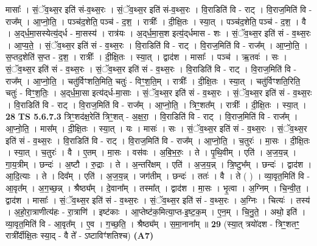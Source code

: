 \documentclass[17pt]{extarticle}
\begin{document}
                  मासाः᳚ । सं॒ॅव॒थ्स॒र इति॑ सं-व॒थ्स॒रः । सं॒ॅव॒थ्स॒र इति॑ सं-व॒थ्स॒रः । वि॒राडिति॑ वि -   राट् । वि॒राज॒मिति॑ वि - राज᳚म् । आ॒प्नो॒ति॒ । पञ्च॑द॒शेति॒ पञ्च॑ - द॒श॒ । रात्रीः᳚ । दी॒क्षि॒तः । स्या॒त् । पञ्च॑द॒शेति॒ पञ्च॑ - द॒श॒ । वै । अ॒द्‌र्ध॒मा॒सस्येत्य॒॑द्‌र्ध - मा॒सस्य॑ ।   रात्र॑यः । अ॒द्‌र्ध॒मा॒स॒श इत्य॒॑द्‌र्धमास -   शः । सं॒ॅव॒थ्स॒र इति॑ सं - व॒थ्स॒रः । आ॒प्य॒ते॒ । सं॒ॅव॒थ्स॒र इति॑ सं - व॒थ्स॒रः । वि॒राडिति॑ वि - राट् । वि॒राज॒मिति॑ वि - राज᳚म् । आ॒प्नो॒ति॒ । स॒प्तद॒शेति॑ स॒प्त - द॒श॒ । रात्रीः᳚ । दी॒क्षि॒तः । स्या॒त् । द्वाद॑श । मासाः᳚ । पञ्च॑ । ऋ॒तवः॑ । सः । सं॒ॅव॒थ्स॒र इति॑ सं - व॒थ्स॒रः । सं॒ॅव॒थ्स॒र इति॑ सं - व॒थ्स॒रः । वि॒राडिति॑ वि - राट् । वि॒राज॒मिति॑ वि - राज᳚म् । आ॒प्नो॒ति॒ । चतु॑र्विꣳशति॒मिति॒ चतुः॑ - विꣳ॒॒श॒ति॒म् । रात्रीः᳚ । दी॒क्षि॒तः । स्या॒त् । चतु॑र्विꣳशति॒रिति॒ चतुः॑ - विꣳ॒॒श॒तिः॒ । अ॒द्‌र्ध॒मा॒सा इत्य॑द्‌र्ध-मा॒साः । सं॒ॅव॒थ्स॒र इति॑ सं - व॒थ्स॒रः । सं॒ॅव॒थ्स॒र इति॑ सं - व॒थ्स॒रः । वि॒राडिति॑ वि - राट् । वि॒राज॒मिति॑ वि - राज᳚म् । आ॒प्नो॒ति॒ । त्रिꣳ॒॒शत᳚म् । रात्रीः᳚ । दी॒क्षि॒तः । स्या॒त् । \textbf{  28} \newline
                  \newline
                                \textbf{ TS 5.6.7.3} \newline
                  त्रिꣳ॒॒शद॑क्ष॒रेति॑ त्रिꣳ॒॒शत् - अ॒क्ष॒रा॒ । वि॒राडिति॑ वि - राट् । वि॒राज॒मिति॑ वि - राज᳚म् । आ॒प्नो॒ति॒ । मास᳚म् । दी॒क्षि॒तः । स्या॒त् । यः । मासः॑ । सः । सं॒ॅव॒थ्स॒र इति॑ सं - व॒थ्स॒रः । सं॒ॅव॒थ्स॒र इति॑ सं - व॒थ्स॒रः । वि॒राडिति॑ वि - राट् । वि॒राज॒मिति॑ वि - राज᳚म् । आ॒प्नो॒ति॒ । च॒तुरः॑ । मा॒सः । दी॒क्षि॒तः । स्या॒त् । च॒तुरः॑ । वै । ए॒तम् । मा॒सः । वस॑वः । अ॒बि॒भ॒रुः॒ । ते । पृ॒थि॒वीम् । एति॑ । अ॒ज॒य॒न्न् । गा॒य॒त्रीम् । छन्दः॑ । अ॒ष्टौ । रु॒द्राः । ते । अ॒न्तरि॑क्षम् । एति॑ । अ॒ज॒य॒न्न् । त्रि॒ष्टुभ᳚म् । छन्दः॑ । द्वाद॑श । आ॒दि॒त्याः । ते । दिव᳚म् । एति॑ । अ॒ज॒य॒न्न् । जग॑तीम् । छन्दः॑ । ततः॑ । वै । ते ( ) । व्या॒वृत॒मिति॑ वि - आ॒वृत᳚म् । अ॒ग॒च्छ॒न्न् । श्रैष्ठ्य᳚म् । दे॒वाना᳚म् । तस्मा᳚त् । द्वाद॑श । मा॒सः । भृ॒त्वा । अ॒ग्निम् । चि॒न्वी॒त॒ । द्वाद॑श । मासाः᳚ । सं॒ॅव॒थ्स॒र इति॑ सं - व॒थ्स॒रः । सं॒ॅव॒थ्स॒र इति॑ सं - व॒थ्स॒रः । अ॒ग्निः । चित्यः॑ । तस्य॑ । अ॒हो॒रा॒त्राणीत्य॑हः - रा॒त्राणि॑ । इष्ट॑काः । आ॒प्तेष्ट॑क॒मित्या॒प्त-इ॒ष्ट॒क॒म् । ए॒न॒म् । चि॒नु॒ते॒ । अथो॒ इति॑ । व्या॒वृत॒मिति॑ वि - आ॒वृत᳚म् । ए॒व । ग॒च्छ॒ति॒ । श्रैष्ठ्य᳚म् । स॒मा॒नाना᳚म् ॥ \textbf{  29 } \newline
                  \newline
                      (स्या॒त् त्रयो॑दश - त्रिꣳ॒॒शतꣳ॒॒ रात्री᳚र्दीक्षि॒तः स्या॒द् - वै ते᳚ - ऽष्टाविꣳ॑शतिश्च)  \textbf{(A7)} \newline \newline
\end{document}
